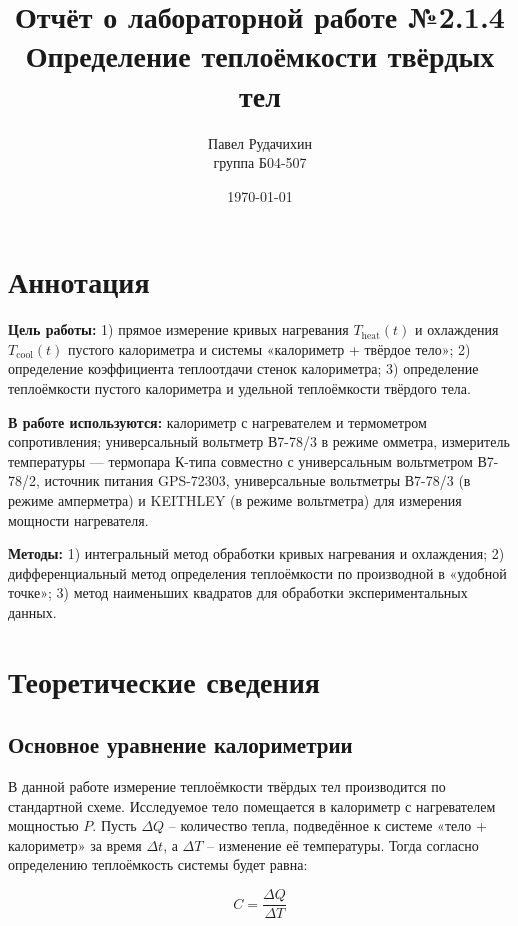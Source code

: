 \documentclass{article}
\title{Отчёт о лабораторной работе №2.1.4 \\ Определение теплоёмкости твёрдых тел}
\author{Павел Рудачихин \\ группа Б04-507}
\date{\today}
\begin{document}
\maketitle

\section*{Аннотация}

\hspace{4mm}\textbf{Цель работы:} 1) прямое измерение кривых нагревания $T_{\text{heat}}(t)$ и охлаждения $T_{\text{cool}}(t)$ пустого калориметра и системы «калориметр + твёрдое тело»; 2) определение коэффициента теплоотдачи стенок калориметра; 3) определение теплоёмкости пустого калориметра и удельной теплоёмкости твёрдого тела.

\textbf{В работе используются:} калориметр с нагревателем и термометром сопротивления; универсальный вольтметр В7-78/3 в режиме омметра, измеритель температуры — термопара К-типа совместно с универсальным вольтметром В7-78/2, источник питания GPS-72303, универсальные вольтметры В7-78/3 (в режиме амперметра) и KEITHLEY (в режиме вольтметра) для измерения мощности нагревателя.

\textbf{Методы:} 1) интегральный метод обработки кривых нагревания и охлаждения; 2) дифференциальный метод определения теплоёмкости по производной в «удобной точке»; 3) метод наименьших квадратов для обработки экспериментальных данных.

\section*{Теоретические сведения}

\subsection*{Основное уравнение калориметрии}

В данной работе измерение теплоёмкости твёрдых тел производится по стандартной схеме. Исследуемое тело помещается в калориметр с нагревателем мощностью $P$. Пусть $\Delta Q$ – количество тепла, подведённое к системе «тело + калориметр» за время $\Delta t$, а $\Delta T$ – изменение её температуры. Тогда согласно определению теплоёмкость системы будет равна:

\begin{equation}
C = \frac{\Delta Q}{\Delta T} \tag{1}
\end{equation}
\end{document}
